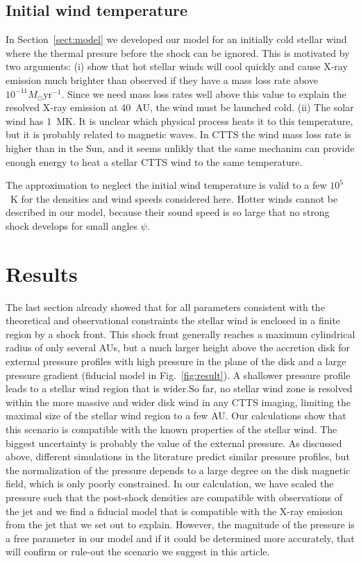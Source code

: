 \documentclass[manuscript]{aastex}
\begin{document}
\subsection{Initial wind temperature}
\label{sect:T_0}
In Section~\ref{sect:model} we developed our model for an initially cold stellar wind where the thermal presure before the shock can be ignored. This is motivated by two arguments: (i) \citet{2007IAUS..243..299M} show that hot stellar winds will cool quickly and cause X-ray emission much brighter than observed if they have a mass loss rate above $10^{-11}M_\odot\mathrm{ yr}^{-1}$. Since we need mass loss rates well above this value to explain the resolved X-ray emission at 40~AU, the wind must be launched cold. (ii) The solar wind has 1~MK. It is unclear which physical process heats it to this temperature, but it is probably related to magnetic waves. In CTTS the wind mass loss rate is higher than in the Sun, and it seems unlikly that the same mechanim can provide enough energy to heat a stellar CTTS wind to the same temperature.

The approximation to neglect the initial wind temperature is valid to a few $10^5$~K for the densities and wind speeds considered here. Hotter winds cannot be described in our model, because their sound speed is so large that no strong shock develops for small angles $\psi$.

\section{Results}
\label{sect:results}
The last section already showed that for all parameters consistent with the theoretical and observational constraints the stellar wind is enclosed in a finite region by a shock front. This shock front generally reaches a maximum cylindrical radius of only several AUs, but a much larger height above the accretion disk for external pressure profiles with high pressure in the plane of the disk and a large pressure gradient (fiducial model in Fig.~\ref{fig:result}). A shallower pressure profile leads to a stellar wind region that is wider.So far, no stellar wind zone is resolved within the more massive and wider disk wind in any CTTS imaging, limiting the maximal size of the stellar wind region to a few AU. Our calculations show that this scenario is compatible with the known properties of the stellar wind. The biggest uncertainty is probably the value of the external pressure. As discussed above, different simulations in the literature predict similar pressure profiles, but the normalization of the pressure depends to a large degree on the disk magnetic field, which is only poorly constrained. In our calculation, we have scaled the pressure such that the post-shock densities are compatible with observations of the jet and we find a fiducial model that is compatible with the X-ray emission from the jet that we set out to explain. However, the magnitude of the pressure is a free parameter in our model and if it could be determined more accurately, that will confirm or rule-out the scenario we suggest in this article.
\end{document}
